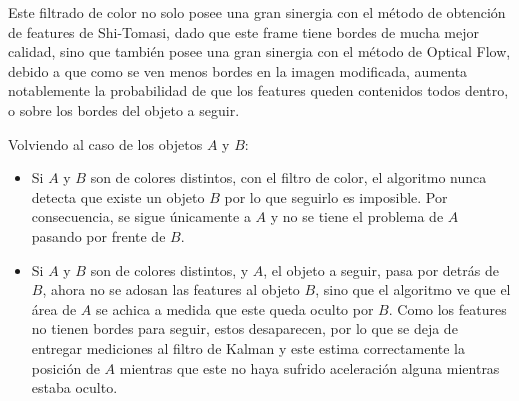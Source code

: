 Este filtrado de color no solo posee una gran sinergia con el método de obtención de features de Shi-Tomasi, dado que este frame tiene bordes de mucha mejor calidad, sino que también posee una gran sinergia con el método de Optical Flow, debido a que como se ven menos bordes en la imagen modificada, aumenta notablemente la probabilidad de que los features queden contenidos todos dentro, o sobre los bordes del objeto a seguir.

Volviendo al caso de los objetos $A$ y $B$:

\begin{itemize}
\item Si $A$ y $B$ son de colores distintos, con el filtro de color, el algoritmo nunca detecta que existe un objeto $B$ por lo que seguirlo es imposible. Por consecuencia, se sigue únicamente a $A$ y no se tiene el problema de $A$ pasando por frente de $B$.
\item Si $A$ y $B$ son de colores distintos, y $A$, el objeto a seguir, pasa por detrás de $B$, ahora no se adosan las features al objeto $B$, sino que el algoritmo ve que el área de $A$ se achica a medida que este queda oculto por $B$. Como los features no tienen bordes para seguir, estos desaparecen, por lo que se deja de entregar mediciones al filtro de Kalman y este estima correctamente la posición de $A$ mientras que este no haya sufrido aceleración alguna mientras estaba oculto. 
\end{itemize}

